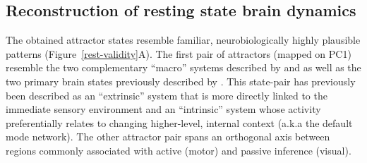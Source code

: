 \documentclass{article}
\begin{document}
\subsection{Reconstruction of resting state brain dynamics}\label{Reconstruction of resting state brain dynamics}

The obtained attractor states resemble familiar, neurobiologically highly plausible patterns (Figure~\ref{rest-validity}A). The first pair of attractors (mapped on PC1) resemble the two complementary ``macro'' systems described by \href{https://doi.org/10.1016/j.neuropsychologia.2007.10.003}{} and \cite{Cioli_2014} as well as the two primary brain states previously described by \cite{Chen_2018}. This state-pair has previously been described as an ``extrinsic'' system that is more directly linked to the immediate sensory environment and an ``intrinsic'' system whose activity preferentially relates to changing higher-level, internal context (a.k.a the default mode network). The other attractor pair spans an orthogonal axis between regions commonly associated with active (motor) and passive inference (visual).
\end{document}
